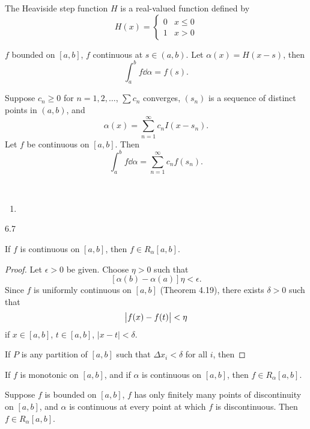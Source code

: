 \begin{example}
The Heaviside step function $H$ is a real-valued function defined by
\[H(x)=\begin{cases}
0&x\le0\\
1&x>0
\end{cases}\]

\begin{proposition*}
$f$ bounded on $[a,b]$, $f$ continuous at $s\in(a,b)$. Let $\alpha(x)=H(x-s)$, then
\[\int_a^b f\dd{\alpha}=f(s).\]
\end{proposition*}

\begin{proposition*}
Suppose $c_n\ge0$ for $n=1,2,\dots$, $\sum c_n$ converges, $(s_n)$ is a sequence of distinct points in $(a,b)$, and
\[\alpha(x)=\sum_{n=1}^{\infty}c_n I(x-s_n).\]
Let $f$ be continuous on $[a,b]$. Then
\[\int_a^b f\dd{\alpha}=\sum_{n=1}^{\infty}c_n f(s_n).\]
\end{proposition*}
\end{example}

\begin{proposition} \
\begin{enumerate}[label=(\arabic*)]
\item 
\end{enumerate}
\end{proposition}

6.7

\begin{proposition}
If $f$ is continuous on $[a,b]$, then $f\in R_\alpha[a,b]$.
\end{proposition}

\begin{proof}
Let $\epsilon>0$ be given. Choose $\eta>0$ such that
\[[\alpha(b)-\alpha(a)]\eta<\epsilon.\]
Since $f$ is uniformly continuous on $[a,b]$ (Theorem 4.19), there exists $\delta>0$ such that
\[\left|f(x)-f(t)\right|<\eta\]
if $x\in[a,b]$, $t\in[a,b]$, $|x-t|<\delta$.

If $P$ is any partition of $[a,b]$ such that $\Delta x_i<\delta$ for all $i$, then
\end{proof}

\begin{proposition}
If $f$ is monotonic on $[a,b]$, and if $\alpha$ is continuous on $[a,b]$, then $f\in R_\alpha[a,b]$.
\end{proposition}

\begin{proposition}
Suppose $f$ is bounded on $[a,b]$, $f$ has only finitely many points of discontinuity on $[a,b]$, and $\alpha$ is continuous at every point at which $f$ is discontinuous. Then $f\in R_\alpha[a,b]$.
\end{proposition}

